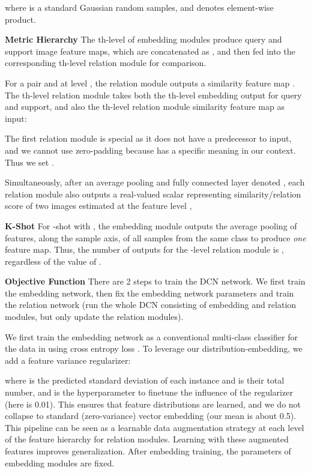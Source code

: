 \documentclass[conference]{IEEEtran}
\def\modelnameshort{DCN}
\newcommand{\keypoint}[1]{\vspace{0.05cm}\noindent\textbf{#1}\quad}
\begin{document}
\noindent where  is a standard Gaussian   random samples, and  denotes element-wise product. 

\keypoint{Metric Hierarchy}
The th-level of embedding modules produce query and support image feature maps, which are concatenated as , and then fed into the corresponding th-level relation module for comparison.

For a pair  and  at level , the relation module outputs a similarity feature map . The th-level relation module takes both the th-level embedding output for query and support, and also the th-level relation module similarity feature map as input:



The first relation module is special as it does not have a predecessor to input, and we cannot use zero-padding because  has a specific meaning in our context. Thus we set .

Simultaneously, after an average pooling and fully connected layer denoted , each relation module also outputs a real-valued scalar representing similarity/relation score  of two images estimated at the feature level ,

\keypoint{K-Shot} For -shot with , the embedding module outputs the average pooling of features, along the sample axis, of all samples from the same class to produce \emph{one} feature map. Thus, the number of outputs for the -level relation module is , regardless of the value of . 

\keypoint{Objective Function} 
There are 2 steps to train the DCN network. We first train the embedding network, then fix the embedding network parameters and train the relation network (run the whole 
\modelnameshort{} consisting of embedding and relation modules, but only update the relation modules).

We first train the embedding network  as a conventional multi-class classifier for the data in  using cross entropy loss . To leverage our distribution-embedding, we add a feature variance regularizer:


where  is the predicted standard deviation of each instance and  is their total number, and  is the hyperparameter to finetune the influence of the regularizer (here is 0.01). This ensures that feature distributions are learned, and we do not collapse to standard (zero-variance) vector embedding (our mean  is about 0.5). This pipeline can be seen as a learnable data augmentation strategy at each level of the feature hierarchy for relation modules. Learning with these augmented features improves generalization. After embedding training, the parameters  of embedding modules are fixed.
\end{document}
